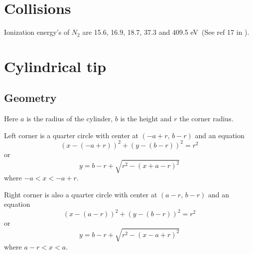 \documentclass[a4paper,10pt]{article}
\numberwithin{equation}{section}
\begin{document}
\clearpage
\section{Collisions}
Ionization energy's of \(N_2\) are 15.6, 16.9, 18.7, 37.3 and 409.5 eV~(See ref 17 in \cite{nogueira1995doubly}).

\section{Cylindrical tip}
\subsection{Geometry}
Here \(a\) is the radius of the cylinder, \(b\) is the height and \(r\) the corner radius.

Left corner is a quarter circle with center at \((-a+r,\, b-r)\) and an equation
\begin{equation}
\left( x - (-a+r) \right)^2 + \left( y - (b-r) \right)^2 = r^2
\end{equation}
or
\begin{equation}
y = b - r + \sqrt{r^2 - (x+a-r)^2}
\end{equation}
where \(-a < x < -a+r\).

Right corner is also a quarter circle with center at \((a-r,\, b-r)\) and an equation
\begin{equation}
\left( x - (a-r) \right)^2 + \left( y - (b-r) \right)^2 = r^2
\end{equation}
or
\begin{equation}
y = b - r + \sqrt{r^2 - (x-a+r)^2}
\end{equation}
where \(a-r < x < a\).
\end{document}
